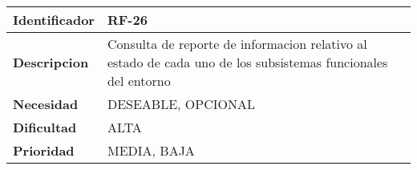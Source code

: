 \begin{center}
    \begin{tabular}{|p{2.6cm}|p{12cm}|}
    \hline
    \textbf{Identificador} & RF-26\\
    \hline
    \textbf{Descripcion} & Consulta de reporte de informacion relativo al estado de cada uno de los subsistemas funcionales del entorno\\
    \hline
    \textbf{Necesidad} & DESEABLE, OPCIONAL\\
    \hline
    \textbf{Dificultad} & ALTA\\
    \hline
    \textbf{Prioridad} & MEDIA, BAJA\\
    \hline
    \end{tabular}
\end{center}
